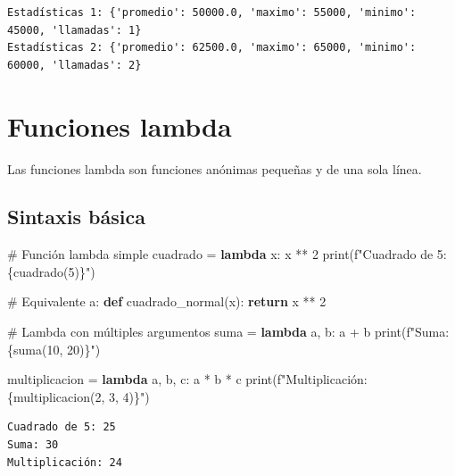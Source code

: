 \documentclass[
  doc,
  floatsintext,
  longtable,
  a4paper,
  nolmodern,
  notxfonts,
  notimes,
  12pt,
  colorlinks=true,linkcolor=blue,citecolor=blue,urlcolor=blue]{apa7}
\newenvironment{Shaded}{\begin{snugshade}}{\end{snugshade}}
\newcommand{\BuiltInTok}[1]{\textcolor[rgb]{0.00,0.23,0.31}{#1}}
\newcommand{\CommentTok}[1]{\textcolor[rgb]{0.37,0.37,0.37}{#1}}
\newcommand{\ControlFlowTok}[1]{\textcolor[rgb]{0.00,0.23,0.31}{\textbf{#1}}}
\newcommand{\DecValTok}[1]{\textcolor[rgb]{0.68,0.00,0.00}{#1}}
\newcommand{\KeywordTok}[1]{\textcolor[rgb]{0.00,0.23,0.31}{\textbf{#1}}}
\newcommand{\NormalTok}[1]{\textcolor[rgb]{0.00,0.23,0.31}{#1}}
\newcommand{\OperatorTok}[1]{\textcolor[rgb]{0.37,0.37,0.37}{#1}}
\newcommand{\SpecialCharTok}[1]{\textcolor[rgb]{0.37,0.37,0.37}{#1}}
\newcommand{\SpecialStringTok}[1]{\textcolor[rgb]{0.13,0.47,0.30}{#1}}
\begin{document}
\begin{verbatim}
Estadísticas 1: {'promedio': 50000.0, 'maximo': 55000, 'minimo': 45000, 'llamadas': 1}
Estadísticas 2: {'promedio': 62500.0, 'maximo': 65000, 'minimo': 60000, 'llamadas': 2}
\end{verbatim}

\section{Funciones lambda}\label{funciones-lambda}

Las funciones lambda son funciones anónimas pequeñas y de una sola
línea.

\subsection{Sintaxis básica}\label{sintaxis-buxe1sica-1}

\begin{Shaded}
\begin{Highlighting}[]
\CommentTok{\# Función lambda simple}
\NormalTok{cuadrado }\OperatorTok{=} \KeywordTok{lambda}\NormalTok{ x: x }\OperatorTok{**} \DecValTok{2}
\BuiltInTok{print}\NormalTok{(}\SpecialStringTok{f"Cuadrado de 5: }\SpecialCharTok{\{}\NormalTok{cuadrado(}\DecValTok{5}\NormalTok{)}\SpecialCharTok{\}}\SpecialStringTok{"}\NormalTok{)}

\CommentTok{\# Equivalente a:}
\KeywordTok{def}\NormalTok{ cuadrado\_normal(x):}
    \ControlFlowTok{return}\NormalTok{ x }\OperatorTok{**} \DecValTok{2}

\CommentTok{\# Lambda con múltiples argumentos}
\NormalTok{suma }\OperatorTok{=} \KeywordTok{lambda}\NormalTok{ a, b: a }\OperatorTok{+}\NormalTok{ b}
\BuiltInTok{print}\NormalTok{(}\SpecialStringTok{f"Suma: }\SpecialCharTok{\{}\NormalTok{suma(}\DecValTok{10}\NormalTok{, }\DecValTok{20}\NormalTok{)}\SpecialCharTok{\}}\SpecialStringTok{"}\NormalTok{)}

\NormalTok{multiplicacion }\OperatorTok{=} \KeywordTok{lambda}\NormalTok{ a, b, c: a }\OperatorTok{*}\NormalTok{ b }\OperatorTok{*}\NormalTok{ c}
\BuiltInTok{print}\NormalTok{(}\SpecialStringTok{f"Multiplicación: }\SpecialCharTok{\{}\NormalTok{multiplicacion(}\DecValTok{2}\NormalTok{, }\DecValTok{3}\NormalTok{, }\DecValTok{4}\NormalTok{)}\SpecialCharTok{\}}\SpecialStringTok{"}\NormalTok{)}
\end{Highlighting}
\end{Shaded}

\begin{verbatim}
Cuadrado de 5: 25
Suma: 30
Multiplicación: 24
\end{verbatim}
\end{document}
